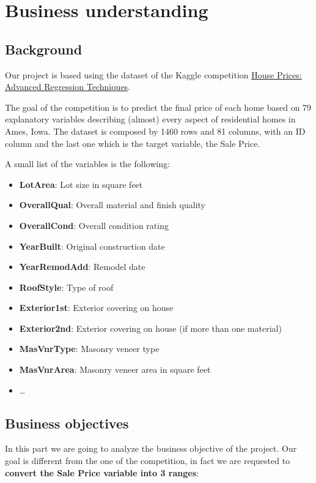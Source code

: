\chapter{Business understanding}
\label{sec:business_understanding}

\section{Background}
Our project is based using the dataset of the Kaggle competition \href{https://www.kaggle.com/c/house-prices-advanced-regression-techniques}{House Prices: Advanced Regression Techniques}. 

The goal of the competition is to predict the final price of each home based on 79 explanatory variables describing (almost) every aspect of residential homes in Ames, Iowa.
The dataset is composed by 1460 rows and 81 columns, with an ID column and the last one which is the target variable, the Sale Price.

A small list of the variables is the following:

\begin{itemize}
    \item \textbf{LotArea}: Lot size in square feet
    \item \textbf{OverallQual}: Overall material and finish quality
    \item \textbf{OverallCond}: Overall condition rating
    \item \textbf{YearBuilt}: Original construction date
    \item \textbf{YearRemodAdd}: Remodel date
    \item \textbf{RoofStyle}: Type of roof
    \item \textbf{Exterior1st}: Exterior covering on house
    \item \textbf{Exterior2nd}: Exterior covering on house (if more than one material)
    \item \textbf{MasVnrType}: Masonry veneer type
    \item \textbf{MasVnrArea}: Masonry veneer area in square feet
    \item \dots
\end{itemize}
\section{Business objectives}
\label{subsec:business_objectives}

In this part we are going to analyze the business objective of the project.
Our goal is different from the one of the competition, in fact we are requested to \textbf{convert the Sale Price variable into 3 ranges}:


